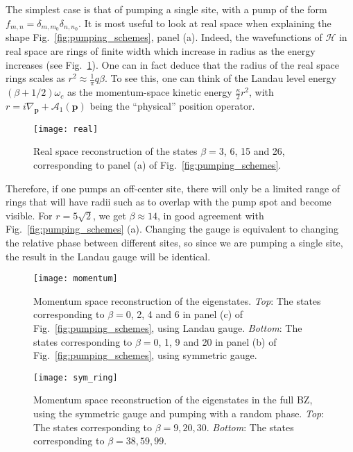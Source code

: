 \documentclass[twocolumn, 10pt, aps, superscriptaddress, floatfix, showpacs, pra, citeautoscript]{revtex4-1}
\newcommand{\co}[2]{#2}
\renewcommand{\paragraph}{\co}
\begin{document}
\paragraph{A δ pump in real space is homogeneous in momentum space.}
The simplest case is that of pumping a single site, with a pump of the
form $f_{m,n} = \delta_{m,m_0} \delta_{n,n_0}$. It is most useful to
look at real space when explaining the shape
Fig.~\ref{fig:pumping_schemes}, panel (a).  Indeed, the wavefunctions
of $\mathcal{H}$ in real space are rings of finite width which
increase in radius as the energy increases (see
Fig.~\ref{fig:delta_real_sp}). One can in fact deduce that the radius
of the real space rings scales as $r^2 \approx \frac{1}{\pi} q \beta$.
To see this, one can think of the Landau level energy
$(\beta + 1/2)\omega_c$ as the momentum-space kinetic energy
$\frac{\kappa}{2}r^2$, with
$r = i\nabla_{\mathbf{p}} + \mathcal{A}_1(\mathbf{p})$ being the
``physical'' position operator.
\begin{figure}[htb]
  \centering
  \texttt{[image: real]} %
  \caption{Real space reconstruction of the states $\beta=3$, 6, 15
    and 26, corresponding to panel (a) of
    Fig.~\ref{fig:pumping_schemes}.}
  \label{fig:delta_real_sp}
\end{figure}


Therefore, if one pumps an off-center site, there will only be a
limited range of rings that will have radii such as to overlap with
the pump spot and become visible. For $r=5\sqrt{2}$, we get
$\beta \approx 14$, in good agreement with
Fig.~\ref{fig:pumping_schemes} (a). Changing the gauge is equivalent
to changing the relative phase between different sites, so since we
are pumping a single site, the result in the Landau gauge will be identical.


%
\begin{figure}[htb]\centering
  \texttt{[image: momentum]} %
  \caption{Momentum space reconstruction of the
    eigenstates. \emph{Top}: The states corresponding to $\beta=0$, 2,
    4 and 6 in panel (c) of Fig.~\ref{fig:pumping_schemes}, using
    Landau gauge.  \emph{Bottom}: The states corresponding to
    $\beta=0$, 1, 9 and 20 in panel (b) of
    Fig.~\ref{fig:pumping_schemes}, using symmetric gauge.}
  \label{fig:hom_mom_sp}
\end{figure}


\begin{figure}[htb]
  \centering
  \texttt{[image: sym\_ring]} %
  \caption{Momentum space reconstruction of the eigenstates in the
    full BZ, using the symmetric gauge and pumping with a random
    phase. \emph{Top}: The states corresponding to
    $\beta = 9, 20, 30$.  \emph{Bottom}: The states corresponding to
    $\beta = 38, 59, 99$.}
  \label{fig:torus_edge}


\end{figure}
\end{document}
